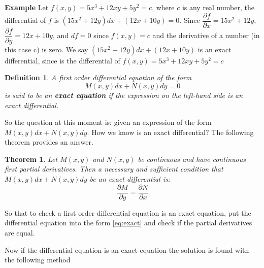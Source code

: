 \documentclass[10pt,a4paper]{article}
\newtheorem{define}{Definition}
\newtheorem{thm}{Theorem}
\begin{document}
\textbf{Example}
Let $ f(x,y) = 5x^3 + 12xy + 5y^2 = c $, where $c$ is any real number, the differential of $f$ is $ (15x^2 + 12y) dx + ( 12x + 10y) = 0 $. Since $ \dfrac{\partial f}{\partial x} = 15x^2 + 12y $, $\dfrac{\partial f}{\partial y} = 12x + 10y$, and $ df = 0 $ since $ f(x,y) = c$ and the derivative of a number (in this case c) is zero. We say $ (15x^2 + 12y) dx + ( 12x + 10y)  $ is an exact differential, since is the differential of $ f(x,y) = 5x^3 + 12xy + 5y^2 = c$
\begin{define}
A first order differential equation of the form
\begin{equation} \label{eq:exact}
M(x,y)dx + N(x,y)dy = 0
\end{equation}
is said to be an \textbf{exact equation} if the expression on the left-hand side is an exact differential.
\end{define}
So the question at this moment is: given an expression of the form $M(x,y)dx + N(x,y)dy$. How we know is an exact differential? The following theorem provides an answer.
\begin{thm}
Let $M(x,y)$ and $N(x,y)$ be continuous and have continuous first partial derivatives. Then a necessary and sufficient condition that $M(x,y)dx + N(x,y)dy$ be an exact differential is:
\begin{equation}
\dfrac{\partial M}{\partial y} = \dfrac{\partial N}{\partial x}
\end{equation} 
\end{thm}
So that to check a first order differential equation is an exact equation, put the differential equation into the form \eqref{eq:exact} and check if the partial derivatives are equal.

Now if the differential equation is an exact equation the solution is found with the following method
\end{document}

